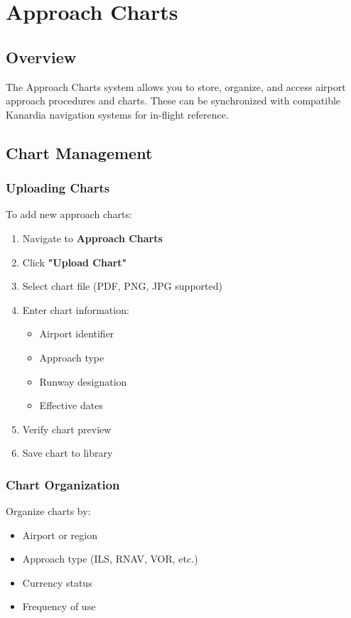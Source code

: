\chapter{Approach Charts}

\section{Overview}

The Approach Charts system allows you to store, organize, and access airport approach procedures and charts. These can be synchronized with compatible Kanardia navigation systems for in-flight reference.

\section{Chart Management}

\subsection{Uploading Charts}

To add new approach charts:

\begin{enumerate}
    \item Navigate to \textbf{Approach Charts}
    \item Click \textbf{"Upload Chart"}
    \item Select chart file (PDF, PNG, JPG supported)
    \item Enter chart information:
    \begin{itemize}
        \item Airport identifier
        \item Approach type
        \item Runway designation
        \item Effective dates
    \end{itemize}
    \item Verify chart preview
    \item Save chart to library
\end{enumerate}

\subsection{Chart Organization}

Organize charts by:
\begin{itemize}
    \item Airport or region
    \item Approach type (ILS, RNAV, VOR, etc.)
    \item Currency status
    \item Frequency of use
\end{itemize}

